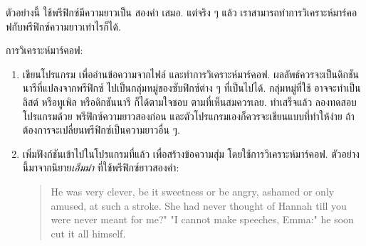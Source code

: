 
ตัวอย่างนี้ ใช้พรีฟิกซ์มีความยาวเป็น สองคำ เสมอ.
แต่จริง ๆ แล้ว เราสามารถทำการวิเคราะห์มาร์คอฟกับพรีฟิกซ์ความยาวเท่าไรก็ได้.

\begin{exercise}


การวิเคราะห์มาร์คอฟ:

\begin{enumerate}


\item เขียนโปรแกรม เพื่ออ่านข้อความจากไฟล์ และทำการวิเคราะห์มาร์คอฟ.
ผลลัพธ์ควรจะเป็นดิกชันนารีที่แปลงจากพรีฟิกซ์ ไปเป็นกลุ่มหมู่ของซับฟิกซ์ต่าง ๆ ที่เป็นไปได้.
กลุ่มหมู่ที่ใช้ อาจจะทำเป็นลิสต์ หรือทูเพิล หรือดิกชันนารี ก็ได้ตามใจชอบ ตามที่เห็นสมควรเลย.
ทำเสร็จแล้ว ลองทดสอบโปรแกรมด้วย พรีฟิกซ์ความยาวสองก่อน 
และตัวโปรแกรมเองก็ควรจะเขียนแบบที่ทำให้ง่าย ถ้าต้องการจะเปลี่ยนพรีฟิกซ์เป็นความยาวอื่น ๆ.


\item เพิ่มฟังก์ชันเข้าไปในโปรแกรมที่แล้ว เพื่อสร้างข้อความสุ่ม โดยใช้การวิเคราะห์มาร์คอฟ.
ตัวอย่างนี้มาจากนิยาย\textit{เอ็มม่า} ที่ใช้พรีฟิกซ์ยาวสองคำ:

\begin{quote}
He was very clever, be it sweetness or be angry, ashamed or only
amused, at such a stroke. She had never thought of Hannah till you
were never meant for me?" "I cannot make speeches, Emma:" he soon cut
it all himself.
\end{quote}



\end{enumerate}
\end{exercise}
